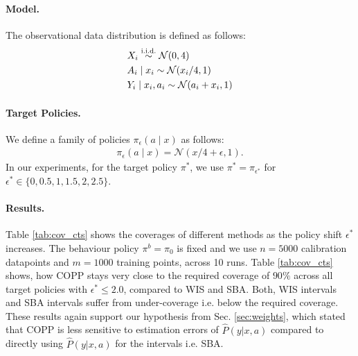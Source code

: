 \paragraph{Model.}
The observational data distribution is defined as follows:
\begin{align}
    & X_i \overset{\textup{i.i.d.}}{\sim} \mathcal{N}(0,4) \nonumber \\
    & A_i \mid x_i \sim \mathcal{N}(x_i/4, 1) \hspace{0.2cm} \nonumber \\
    & Y_i \mid x_i, a_i \sim \mathcal{N}(a_i + x_i, 1) \nonumber
\end{align}
\paragraph{Target Policies.}
We define a family of policies $\pi_\epsilon(a \mid x)$ as follows:
\begin{align}
    \pi_\epsilon(a \mid x) = \mathcal{N}(x/4 + \epsilon, 1). \label{tar_pols}
\end{align}
In our experiments, for the target policy $\pi^*$, we use $\pi^* = \pi_{\epsilon^*}$ for $\epsilon^* \in \{0, 0.5, 1, 1.5, 2, 2.5\}$.

\paragraph{Results.}
Table \ref{tab:cov_cts} shows the coverages of different methods as the policy shift $\epsilon^*$ increases. The behaviour policy $\pi^b = \pi_{0}$ is fixed and we use $n=5000$ calibration datapoints and $m=1000$ training points, across 10 runs. Table \ref{tab:cov_cts} shows, how COPP stays very close to the required coverage of $90\%$ across all target policies with $\epsilon^* \leq 2.0$, compared to WIS and SBA. Both, WIS intervals and SBA intervals suffer from under-coverage i.e. below the required coverage. These results again support our hypothesis from Sec. \ref{sec:weights}, which stated that COPP is less sensitive to estimation errors of $\hat{P}(y|x, a)$ compared to directly using $\hat{P}(y|x, a)$ for the intervals i.e. SBA.

